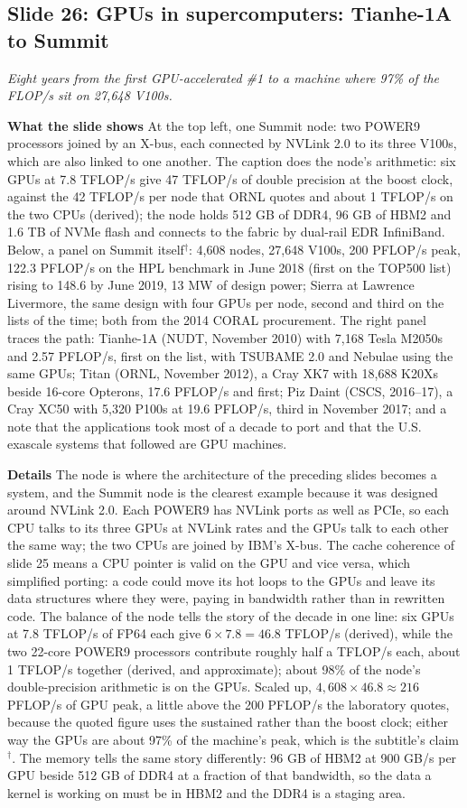\documentclass[11pt,letterpaper]{article}
\newcommand{\slide}[3]{%
  \subsection[Slide #1: #2]{Slide #1: #2}%
  {\color{muted}\itshape #3\par}\medskip}
\newcommand{\para}[1]{\medskip\noindent\textbf{#1}\quad}
\begin{document}
\slide{26}{GPUs in supercomputers: Tianhe-1A to Summit}{Eight years from the first GPU-accelerated \#1 to a machine where 97\% of the FLOP/s sit on 27{,}648 V100s.}

\para{What the slide shows} At the top left, one Summit node: two POWER9 processors joined by an X-bus, each connected by NVLink 2.0 to its three V100s, which are also linked to one another. The caption does the node's arithmetic: six GPUs at 7.8 TFLOP/s give 47 TFLOP/s of double precision at the boost clock, against the 42 TFLOP/s per node that ORNL quotes and about 1 TFLOP/s on the two CPUs (derived); the node holds 512 GB of DDR4, 96 GB of HBM2 and 1.6 TB of NVMe flash and connects to the fabric by dual-rail EDR InfiniBand. Below, a panel on Summit itself$^\dagger$: 4,608 nodes, 27,648 V100s, 200 PFLOP/s peak, 122.3 PFLOP/s on the HPL benchmark in June 2018 (first on the TOP500 list) rising to 148.6 by June 2019, 13 MW of design power; Sierra at Lawrence Livermore, the same design with four GPUs per node, second and third on the lists of the time; both from the 2014 CORAL procurement. The right panel traces the path: Tianhe-1A (NUDT, November 2010) with 7,168 Tesla M2050s and 2.57 PFLOP/s, first on the list, with TSUBAME 2.0 and Nebulae using the same GPUs; Titan (ORNL, November 2012), a Cray XK7 with 18,688 K20Xs beside 16-core Opterons, 17.6 PFLOP/s and first; Piz Daint (CSCS, 2016--17), a Cray XC50 with 5,320 P100s at 19.6 PFLOP/s, third in November 2017; and a note that the applications took most of a decade to port and that the U.S. exascale systems that followed are GPU machines.

\para{Details} The node is where the architecture of the preceding slides becomes a system, and the Summit node is the clearest example because it was designed around NVLink 2.0. Each POWER9 has NVLink ports as well as PCIe, so each CPU talks to its three GPUs at NVLink rates and the GPUs talk to each other the same way; the two CPUs are joined by IBM's X-bus. The cache coherence of slide 25 means a CPU pointer is valid on the GPU and vice versa, which simplified porting: a code could move its hot loops to the GPUs and leave its data structures where they were, paying in bandwidth rather than in rewritten code. The balance of the node tells the story of the decade in one line: six GPUs at 7.8 TFLOP/s of FP64 each give $6 \times 7.8 = 46.8$ TFLOP/s (derived), while the two 22-core POWER9 processors contribute roughly half a TFLOP/s each, about 1 TFLOP/s together (derived, and approximate); about 98\% of the node's double-precision arithmetic is on the GPUs. Scaled up, $4{,}608 \times 46.8 \approx 216$ PFLOP/s of GPU peak, a little above the 200 PFLOP/s the laboratory quotes, because the quoted figure uses the sustained rather than the boost clock; either way the GPUs are about 97\% of the machine's peak, which is the subtitle's claim$^\dagger$. The memory tells the same story differently: 96 GB of HBM2 at 900 GB/s per GPU beside 512 GB of DDR4 at a fraction of that bandwidth, so the data a kernel is working on must be in HBM2 and the DDR4 is a staging area.
\end{document}

